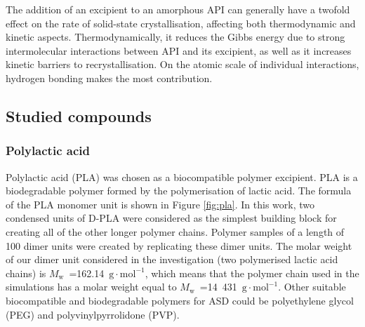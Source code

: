 The addition of an excipient to an amorphous API can generally have a twofold effect on the rate of solid-state crystallisation, affecting both thermodynamic and kinetic aspects. Thermodynamically, it reduces the Gibbs energy due to strong intermolecular interactions between API and its excipient, as well as it increases kinetic barriers to recrystallisation. On the atomic scale of individual interactions, hydrogen bonding makes the most contribution. \cite{newman_what_2022}

\subsection{Studied compounds}
\subsubsection{Polylactic acid}
Polylactic acid (PLA) was chosen as a biocompatible polymer excipient.  PLA is a biodegradable polymer formed by the polymerisation of lactic acid. The formula of the PLA monomer unit is shown in Figure \ref{fig:pla}. In this work, two condensed units of D-PLA were considered as the simplest building block for creating all of the other longer polymer chains. Polymer samples of a length of 100 dimer units were created by replicating these dimer units. The molar weight of our dimer unit considered in the investigation (two polymerised lactic acid chains) is $M_\mathrm{w}$~=162.14~$\mathrm{g \cdot mol^{-1}}$, which means that the polymer chain used in the simulations has a molar weight equal to  $M_\mathrm{w}$~=14~431~$\mathrm{g \cdot mol^{-1}}$. Other suitable biocompatible and biodegradable polymers for ASD could be polyethylene glycol (PEG) and polyvinylpyrrolidone (PVP). \cite{klajmon_glass_2023} 

